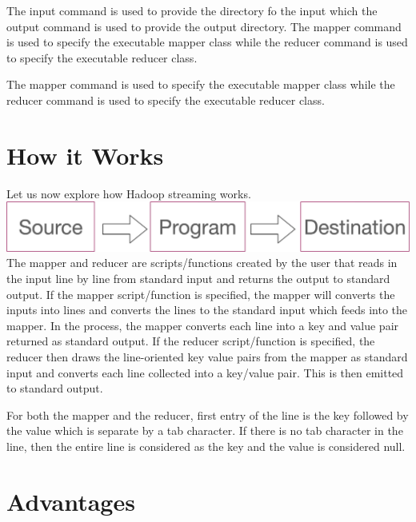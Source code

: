 \documentclass[11pt]{book}
\begin{document}
The input command is used to provide the directory fo the input which the output command is used to provide the output directory. The mapper command is used to specify the executable mapper class while the reducer command is used to specify the executable reducer class.

The mapper command is used to specify the executable mapper class while the reducer command is used to specify the executable reducer class.

\section{How it Works}

Let us now explore how Hadoop streaming works.\\

\includegraphics[width=14cm]{streaming}\\

The mapper and reducer are scripts/functions created by the user that reads in the input line by line from standard input and returns the output to standard output. If the mapper script/function is specified, the mapper will converts the inputs into lines and converts the lines to the standard input which feeds into the mapper. In the process, the mapper converts each line into a key and value pair returned as standard output. If the reducer script/function is specified, the reducer then draws the line-oriented key value pairs from the mapper as standard input and converts each line collected into a key/value pair. This is then emitted to standard output. 

For both the mapper and the reducer, first entry of the line is the key followed by the value which is separate by a tab character. If there is no tab character in the line, then the entire line is considered as the key and the value is considered null. 

\section{Advantages}
\end{document}
